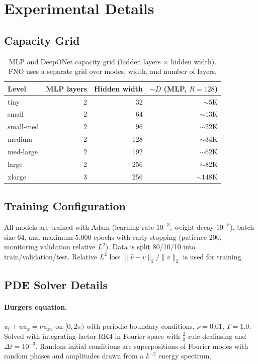 \documentclass[11pt]{article}
\begin{document}
\appendix

\section{Experimental Details}
\label{app:details}

\subsection{Capacity Grid}

\begin{table}[h]
\centering
\caption{MLP and DeepONet capacity grid (hidden layers $\times$ hidden
width). FNO uses a separate grid over modes, width, and number of
layers.}
\label{tab:capacity-grid}
\begin{tabular}{@{}lrrr@{}}
\toprule
\textbf{Level} & \textbf{MLP layers} & \textbf{Hidden width} &
\textbf{$\sim D$ (MLP, $R\!=\!128$)} \\
\midrule
tiny      & 2 & 32  & $\sim$5K \\
small     & 2 & 64  & $\sim$13K \\
small-med & 2 & 96  & $\sim$22K \\
medium    & 2 & 128 & $\sim$34K \\
med-large & 2 & 192 & $\sim$62K \\
large     & 2 & 256 & $\sim$82K \\
xlarge    & 3 & 256 & $\sim$148K \\
\bottomrule
\end{tabular}
\end{table}

\subsection{Training Configuration}
All models are trained with Adam (learning rate $10^{-3}$, weight decay
$10^{-5}$), batch size 64, and maximum 5{,}000 epochs with early
stopping (patience 200, monitoring validation relative $L^2$). Data is
split 80/10/10 into train/validation/test. Relative $L^2$ loss
$\|\hat{v} - v\|_2 / \|v\|_2$ is used for training.

\subsection{PDE Solver Details}

\paragraph{Burgers equation.}
$u_t + u u_x = \nu u_{xx}$ on $[0, 2\pi)$ with periodic boundary
conditions, $\nu = 0.01$, $T = 1.0$. Solved with integrating-factor
RK4 in Fourier space with $\frac{2}{3}$-rule dealiasing and
$\Delta t = 10^{-3}$. Random initial conditions are superpositions of
Fourier modes with random phases and amplitudes drawn from a $k^{-2}$
energy spectrum.
\end{document}
